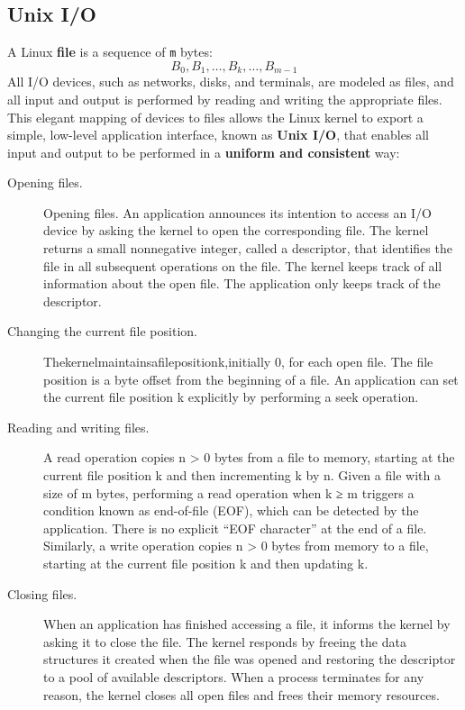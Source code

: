 \documentclass[11pt]{article}
\begin{document}
\subsection{Unix I/O}
\label{sec:orgf7b1e5d}
A Linux \textbf{file} is a sequence of \texttt{m} bytes:\\
\begin{equation}
B_0, B_1, \dots, B_k, \dots, B_{m-1}
\end{equation}
All I/O devices, such as networks, disks, and terminals, are modeled as files, and all input and output is performed by reading and writing the appropriate files. This elegant mapping of devices to files allows the Linux kernel to export a simple, low-level application interface, known as \textbf{Unix I/O}, that enables all input and output to be performed in a \textbf{uniform and consistent} way:\\
\begin{description}
\item[{Opening files.}] Opening files. An application announces its intention to access an I/O device by asking the kernel to open the corresponding file. The kernel returns a small nonnegative integer, called a descriptor, that identifies the file in all subsequent operations on the file. The kernel keeps track of all information about the open file. The application only keeps track of the descriptor.\\
\item[{Changing the current file position.}] Thekernelmaintainsafilepositionk,initially 0, for each open file. The file position is a byte offset from the beginning of a file. An application can set the current file position k explicitly by performing a seek operation.\\
\item[{Reading and writing files.}] A read operation copies n > 0 bytes from a file to memory, starting at the current file position k and then incrementing k by n. Given a file with a size of m bytes, performing a read operation when k ≥ m triggers a condition known as end-of-file (EOF), which can be detected by the application. There is no explicit “EOF character” at the end of a file. Similarly, a write operation copies n > 0 bytes from memory to a file, starting at the current file position k and then updating k.\\
\item[{Closing files.}] When an application has finished accessing a file, it informs the kernel by asking it to close the file. The kernel responds by freeing the data structures it created when the file was opened and restoring the descriptor to a pool of available descriptors. When a process terminates for any reason, the kernel closes all open files and frees their memory resources.\\
\end{description}
\end{document}
